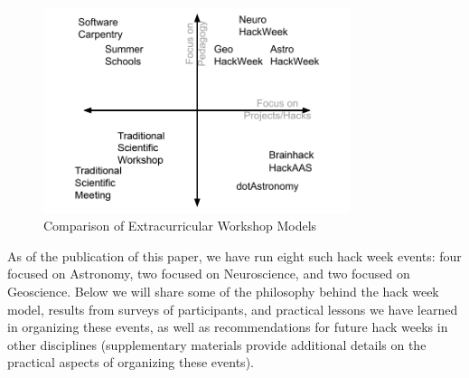 \begin{figure}
\begin{center}
\includegraphics[width=9cm]{fig/HackSpectrum}
\caption{Comparison of Extracurricular Workshop Models}
\label{fig:hackspectrum}
\end{center}
\end{figure}

As of the publication of this paper, we have run eight such hack week events: four focused on Astronomy, two focused on Neuroscience, and two focused on Geoscience.
Below we will share some of the philosophy behind the hack week model, results from surveys of participants, and practical lessons we have learned in organizing these events, as well as recommendations for future hack weeks in other disciplines (supplementary materials provide additional details on the practical aspects of organizing these events).
